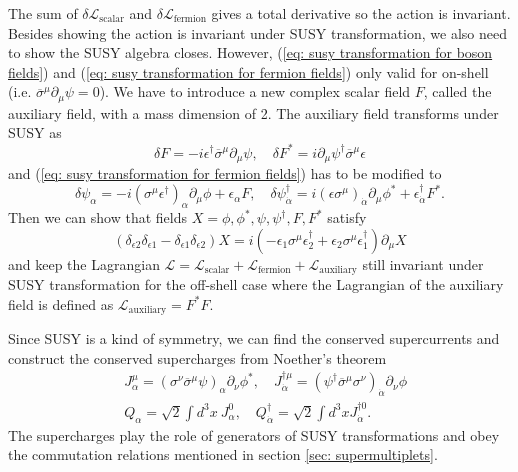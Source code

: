 \documentclass[12pt]{report}
\begin{document}
The sum of $\delta \mathcal{L}_{\mathrm{scalar}}$ and $\delta \mathcal{L}_{\mathrm{fermion}}$ gives a total derivative so the action is invariant.
Besides showing the action is invariant under SUSY transformation, we also need to show the SUSY algebra closes.
However, (\ref{eq: susy transformation for boson fields}) and (\ref{eq: susy transformation for fermion fields}) only valid for on-shell (i.e. $\overline{\sigma}^{\mu} \partial_{\mu} \psi = 0$).
We have to introduce a new complex scalar field $F$, called the auxiliary field, with a mass dimension of 2.
The auxiliary field transforms under SUSY as
\begin{equation}
\delta F = - i \epsilon^{\dag} \overline{\sigma}^{\mu} \partial_{\mu} \psi, \quad 
\delta F^{*} = i \partial_{\mu} \psi^{\dag} \overline{\sigma}^{\mu} \epsilon
\end{equation}
and (\ref{eq: susy transformation for fermion fields}) has to be modified to
\begin{equation}
\delta \psi_{\alpha} = -i (\sigma^{\mu} \epsilon^{\dag})_{\alpha} \partial_{\mu} \phi + \epsilon_{\alpha} F, \quad 
\delta \psi^{\dag}_{\dot{\alpha}} = i (\epsilon \sigma^{\mu})_{\dot{\alpha}} \partial_{\mu} \phi^{*} + \epsilon^{\dag}_{\dot{\alpha}} F^{*}.
\end{equation}
Then we can show that fields $X = \phi, \phi^{*}, \psi, \psi^{\dag}, F, F^{*}$ satisfy
\begin{equation}
(\delta_{\epsilon2} \delta_{\epsilon1} - \delta_{\epsilon1} \delta_{\epsilon2}) X = i (- \epsilon_{1} \sigma^{\mu} \epsilon^{\dag}_{2} + \epsilon_{2} \sigma^{\mu} \epsilon^{\dag}_{1}) \partial_{\mu} X
\end{equation}
and keep the Lagrangian $\mathcal{L} = \mathcal{L}_{\mathrm{scalar}} + \mathcal{L}_{\mathrm{fermion}} + \mathcal{L}_{\mathrm{auxiliary}}$ still invariant under SUSY transformation for the off-shell case where the Lagrangian of the auxiliary field is defined as $\mathcal{L}_{\mathrm{auxiliary}} = F^{*} F$.

Since SUSY is a kind of symmetry, we can find the conserved supercurrents and construct the conserved supercharges from Noether's theorem
\begin{align}
& J^{\mu}_{\alpha} = (\sigma^{\nu} \overline{\sigma}^{\mu} \psi)_{\alpha} \partial_{\nu} \phi^{*}, \quad 
J^{\dag \mu}_{\dot{\alpha}} = ( \psi^{\dag} \overline{\sigma}^{\mu} \sigma^{\nu})_{\dot{\alpha}} \partial_{\nu} \phi\\
%
& Q_{\alpha} = \sqrt{2} \int d^{3}x \ J^{0}_{\alpha}, \quad 
Q^{\dag}_{\dot{\alpha}} = \sqrt{2} \int d^{3}x J^{\dag 0}_{\dot{\alpha}} .
\end{align}
The supercharges play the role of generators of SUSY transformations and obey the commutation relations mentioned in section \ref{sec: supermultiplets}.
\end{document}
